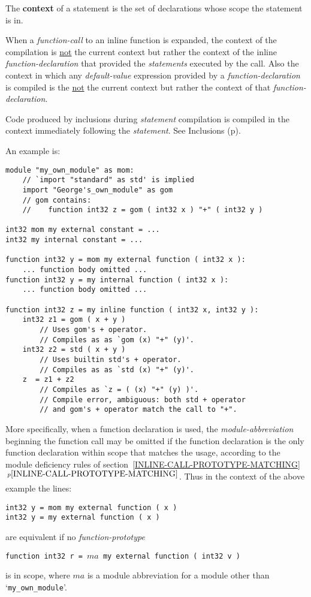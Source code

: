\documentclass[12pt]{article}
\newcommand{\key}[1]{{\rm \bfseries #1}}
\newcommand{\itemref}[1]{\ref{#1}$\,^{p\pageref{#1}}$}
\newcommand{\pagref}[1]{p\pageref{#1}}
\newenvironment{indpar}[1][0.3in]%
	{\begin{list}{}%
		     {\setlength{\itemsep}{0in}%
		      \setlength{\topsep}{0in}%
		      \setlength{\parsep}{1ex}%
		      \setlength{\labelwidth}{#1}%
		      \setlength{\leftmargin}{#1}%
		      \addtolength{\leftmargin}{\labelsep}}%
	 \item}%
	{\end{list}}
\begin{document}
The \key{context}\label{CONTEXT} of a statement is the set of declarations
whose scope the statement is in.

When a {\em function-call} to an inline function is expanded,
the context of the compilation is \underline{not} the current context but
rather the context of the inline {\em function-declaration}
that provided the {\em statements} executed by the call.
Also the context in which any {\em default-value} expression
provided by a {\em function-declaration} is compiled\label{DEFAULT-CONTEXT}
is the \underline{not} the current context but
rather the context of that {\em function-declaration}.

Code produced by inclusions during {\em statement} compilation
is compiled in the context immediately following
the {\em statement}.  See Inclusions (\pagref{INCLUSIONS}).

An example is:
\begin{indpar}\begin{verbatim}
module "my_own_module" as mom:
    // `import "standard" as std' is implied
    import "George's_own_module" as gom
    // gom contains:
    //    function int32 z = gom ( int32 x ) "+" ( int32 y )

int32 mom my external constant = ...
int32 my internal constant = ...

function int32 y = mom my external function ( int32 x ):
    ... function body omitted ...
function int32 y = my internal function ( int32 x ):
    ... function body omitted ...

function int32 z = my inline function ( int32 x, int32 y ):
    int32 z1 = gom ( x + y )
        // Uses gom's + operator.
        // Compiles as as `gom (x) "+" (y)'.
    int32 z2 = std ( x + y )
        // Uses builtin std's + operator.
        // Compiles as as `std (x) "+" (y)'.
    z  = z1 + z2 
        // Compiles as `z = ( (x) "+" (y) )'.
        // Compile error, ambiguous: both std + operator
        // and gom's + operator match the call to "+".
\end{verbatim}\end{indpar}\label{EXTERNAL-INTERNAL-EXAMPLE}

More specifically,
when a function declaration is used, the {\em module-abbreviation}
beginning the function call may be omitted if the function declaration is
the only function declaration within scope that matches the usage,
according to the module deficiency rules of
section~\itemref{INLINE-CALL-PROTOTYPE-MATCHING}.
Thus in the context of the above example the lines:
\begin{indpar}\begin{verbatim}
int32 y = mom my external function ( x )
int32 y = my external function ( x )
\end{verbatim}\end{indpar}
are equivalent if no {\em function-prototype}
\begin{center}
\tt function int32 r = $ma$ my external function ( int32 v )
\end{center}
is in scope, where $ma$ is a module abbreviation for a module
other than `{\tt my\_own\_module}'.
\end{document}

